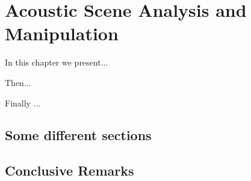 \chapter{Acoustic Scene Analysis and Manipulation}
\label{chap:Processing}
\thispagestyle{plain}
\vspace{0.5cm}

\noindent In this chapter we present...

Then...

Finally ...


\section{Some different sections}

\section{Conclusive Remarks}
